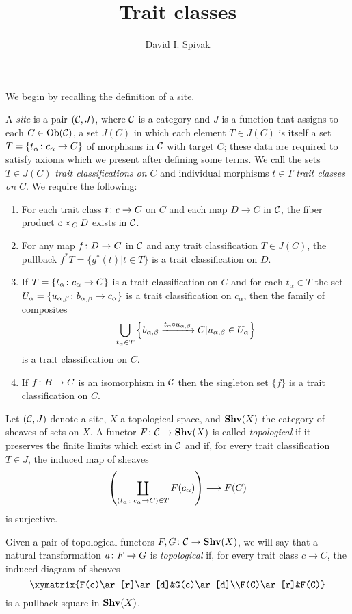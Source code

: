 \documentclass{amsart}
\def\Shv{{\bf Shv}}
\begin{document}
\title{Trait classes}

\author{David I. Spivak}

\maketitle

We begin by recalling the definition of a site.

\begin{definition}

A {\em site} is a pair $(\mathcal{C},J)$, where $\mathcal{C}$ is a category and $J$ is a function that assigns to each $C\in\textnormal{Ob}(\mathcal{C})$,  a set $J(C)$ in which each element $T\in J(C)$ is itself a set $T=\{t_\alpha\colon c_\alpha\rightarrow C\}$ of morphisms in $\mathcal{C}$ with target $C$; these data are required to satisfy axioms which we present after defining some terms.  We call the sets $T\in J(C)$ {\em trait classifications on $C$} and individual morphisms $t\in T$ {\em trait classes on $C$}.  We require the following: \begin{enumerate}\item For each trait class $t\colon c\rightarrow C$ on $C$ and each map $D\to C$ in $\mathcal{C}$, the fiber product $c\times_CD$ exists in $\mathcal{C}$.\item For any map $f\colon D\rightarrow C$ in $\mathcal{C}$ and any trait classification $T\in J(C)$, the pullback $f^*T=\{g^*(t)|t\in T\}$ is a trait classification on $D$.\item If $T=\{t_\alpha\colon c_\alpha\rightarrow C\}$ is a trait classification on $C$ and for each $t_\alpha\in T$ the set $U_\alpha=\{u_{\alpha,\beta}\colon b_{\alpha,\beta}\rightarrow c_\alpha\}$ is a trait classification on $c_\alpha$, then the family of composites $$\bigcup_{t_\alpha\in T}\left\{b_{\alpha,\beta}\xrightarrow{t_\alpha\circ u_{\alpha,\beta}}C|u_{\alpha,\beta}\in U_\alpha\right\}$$ is a trait classification on $C$.\item If $f\colon B\rightarrow C$ is an isomorphism in $\mathcal{C}$ then the singleton set $\{f\}$ is a trait classification on $C$.\end{enumerate}

\end{definition}

\begin{definition}

Let $(\mathcal{C},J)$ denote a site, $X$ a topological space, and $\Shv(X)$ the category of sheaves of sets on $X$.  A functor $F\taking\mcC\to\Shv(X)$ is called {\em topological} if it preserves the finite limits which exist in $\mathcal{C}$ and if, for every trait classification $T\in J$, the induced map of sheaves $$\left(\coprod_{(t_\alpha\colon c_\alpha\rightarrow C)\in T}F(c_\alpha)\right)\longrightarrow F(C)$$ is surjective.

Given a pair of topological functors $F,G\taking\mcC\to\Shv(X)$, we will say that a natural transformation $a\colon F\rightarrow G$ is {\em topological} if, for every trait class $c\to C$, the induced diagram of sheaves $$\xymatrix{F(c)\ar[r]\ar[d]&G(c)\ar[d]\\F(C)\ar[r]&F(C)}$$ is a pullback square in $\Shv(X)$.

\end{definition}
\end{document}
